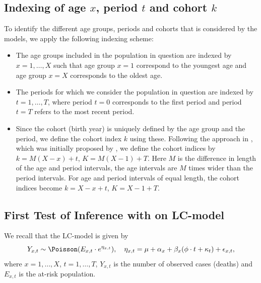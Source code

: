 \subsection{Indexing of age $x$, period $t$ and cohort $k$}
To identify the different age groups, periods and cohorts that is considered by the models, we apply the following indexing scheme:
\begin{itemize}
    \item The age groups included in the population in question are indexed by $x = 1,\ldots,X$ such that age group $x=1$ correspond to the youngest age and age group $x=X$ corresponds to the oldest age.
    \item The periods for which we consider the population in question are indexed by $t=1,\ldots,T$, where period $t=0$ corresponds to the first period and period $t = T$ refers to the most recent period. 
    \item Since the cohort (birth year) is uniquely defined by the age group and the period, we define the cohort index $k$ using these. Following the approach in \cite{rieblerHeld2010}, which was initially proposed by \cite{Heuer1997}, we define the cohort indices by $k = M(X - x) + t$, $K = M(X - 1) + T$. Here $M$ is the difference in length of the age and period intervals, the age intervals are $M$ times wider than the period intervals. For age and period intervals of equal length, the cohort indices become $k = X - x + t$, $K = X - 1 + T.$
\end{itemize}

\subsection{First Test of Inference with \inlabru on LC-model}
\label{sec:synthFirstInferenceLC}
We recall that the LC-model is given by
\begin{equation}
    Y_{x,t} \sim \Poisson(E_{x,t}\cdot e^{\eta_{x,t}}), \quad \eta_{x,t} = \mu + \alpha_x + \beta_x(\phi \cdot t + \kappa_t) + \epsilon_{x,t},
    \label{eq:LC-rewritten-rep1}
\end{equation}
where $x = 1,\ldots,X$, $t = 1,\ldots,T$, $Y_{x,t}$ is the number of observed cases (deaths) and $E_{x,t}$ is the at-risk population.

